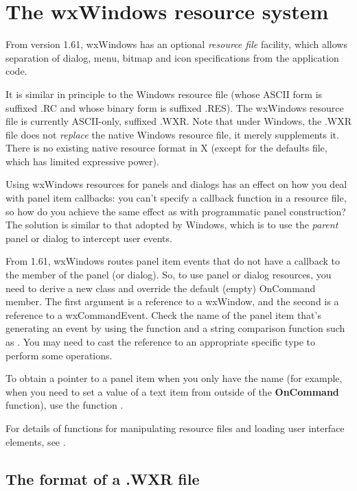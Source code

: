 \section{The wxWindows resource system}\label{resourceformats}

From version 1.61, wxWindows has an optional {\it resource file} facility,
which allows separation of dialog, menu, bitmap and icon specifications
from the application code.

It is similar in principle to the Windows resource file (whose ASCII form is
suffixed .RC and whose binary form is suffixed .RES). The wxWindows resource
file is currently ASCII-only, suffixed .WXR. Note that under Windows,
the .WXR file does not {\it replace} the native Windows resource file,
it merely supplements it. There is no existing native resource format in X
(except for the defaults file, which has limited expressive power).

Using wxWindows resources for panels and dialogs has an effect on how
you deal with panel item callbacks: you can't specify a callback function in
a resource file, so how do you achieve the same effect as with programmatic
panel construction? The solution is similar to that adopted by Windows, which
is to use the {\it parent} panel or dialog to intercept user events.

From 1.61, wxWindows routes panel item events that do not have a callback
to the  member of the panel (or dialog). So, to use
panel or dialog resources, you need to derive a new class and override the
default (empty) OnCommand member. The first argument is a reference
to a wxWindow, and the second is a reference to a wxCommandEvent. Check the
name of the panel item that's generating an event by using the \rtfsp
function and a string comparison function such as .
You may need to cast the reference to an appropriate specific type to perform
some operations.

To obtain a pointer to a panel item when you only have the name (for example,
when you need to set a value of a text item from outside of the {\bf OnCommand} function),
use the function .

For details of functions for manipulating resource files and loading
user interface elements, see .

\subsection{The format of a .WXR file}


